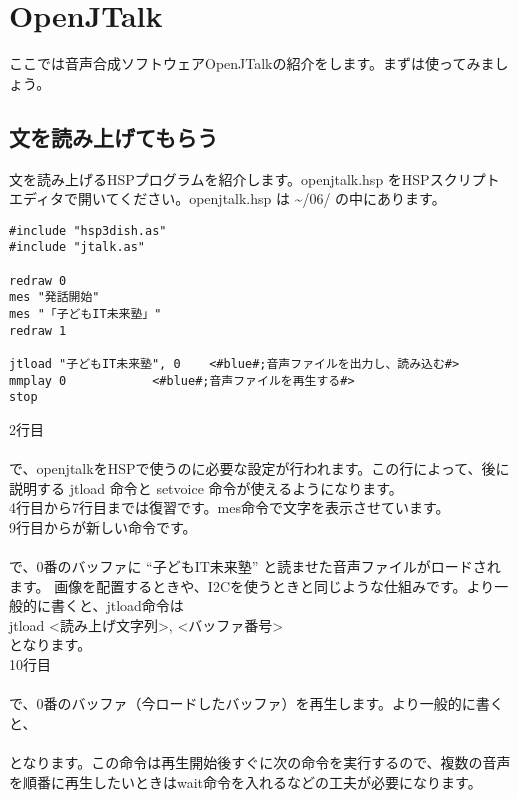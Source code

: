 \section{OpenJTalk}
ここでは音声合成ソフトウェアOpenJTalkの紹介をします。まずは使ってみましょう。
\subsection{文を読み上げてもらう}
文を読み上げるHSPプログラムを紹介します。openjtalk.hsp をHSPスクリプトエディタで開いてください。openjtalk.hsp は  \textasciitilde /06/ の中にあります。\\

\begin{lstlisting}[caption=openjtalk.hsp,label=openjtalk.hsp]
#include "hsp3dish.as"
#include "jtalk.as"

redraw 0
mes "発話開始"
mes "「子どもIT未来塾」"
redraw 1

jtload "子どもIT未来塾", 0	<#blue#;音声ファイルを出力し、読み込む#>
mmplay 0			<#blue#;音声ファイルを再生する#>
stop
\end{lstlisting}

2行目\\
\\
で、openjtalkをHSPで使うのに必要な設定が行われます。この行によって、後に説明する jtload 命令と setvoice 命令が使えるようになります。\\
4行目から7行目までは復習です。mes命令で文字を表示させています。\\
9行目からが新しい命令です。\\
\\
で、0番のバッファに “子どもIT未来塾” と読ませた音声ファイルがロードされます。 画像を配置するときや、I2Cを使うときと同じような仕組みです。より一般的に書くと、jtload命令は\\
jtload <読み上げ文字列>, <バッファ番号>\\
となります。\\
10行目\\
\\
で、0番のバッファ（今ロードしたバッファ）を再生します。より一般的に書くと、\\
\\
となります。この命令は再生開始後すぐに次の命令を実行するので、複数の音声を順番に再生したいときはwait命令を入れるなどの工夫が必要になります。\\

\begin{tcolorbox}[title=\useOmetoi]
\begin{enumerate}
\end{enumerate}
\end{tcolorbox}
